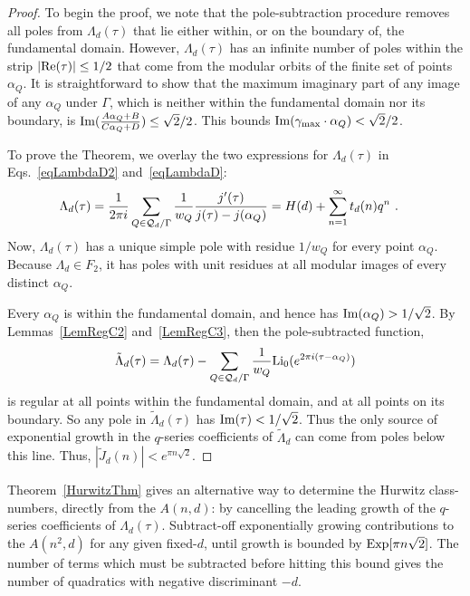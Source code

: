 \documentclass[11pt,a4paper]{article}
\newcommand{\g}{\gamma}
\newcommand{\G}{\Gamma}
\begin{document}
\begin{proof}
To begin the proof, we note that the pole-subtraction procedure removes all poles from $\Lambda_d(\tau)$ that lie either within, or on the boundary of, the fundamental domain. However, $\Lambda_d(\tau)$ has an infinite number of poles within the strip $|{\rm Re}(\tau)| \leq 1/2$ that come from the modular orbits of the finite set of points $\alpha_Q$. It is straightforward to show that the maximum imaginary part of any image of any $\alpha_Q$ under $\G$, which is neither within the fundamental domain nor its boundary, is ${\rm Im}(\frac{A  \alpha_Q + B}{C  \alpha_Q + D}) \leq \sqrt{2}/2$. This bounds ${\rm Im}(\g_{\rm max} \cdot \alpha_Q) <\sqrt{2}/2$. 

To prove the Theorem, we overlay the two expressions for $\Lambda_d(\tau)$ in Eqs.~\eqref{eqLambdaD2} and~\eqref{eqLambdaD}:
\begin{align}
\Lambda_d(\tau) 
&= \frac{1}{2 \pi i} \sum_{Q \in {\cal Q}_d/\G} \frac{1}{w_Q} \frac{j'(\tau)}{j(\tau) - j(\alpha_Q)}
= H(d) + \sum_{n = 1}^{\infty} t_d(n) q^n~.
\end{align}
Now, $\Lambda_d(\tau)$ has a unique simple pole with residue $1/w_Q$ for every point $\alpha_Q$. Because $\Lambda_d \in F_2$, it has poles with unit residues at all modular images of every distinct $\alpha_Q$. 

Every $\alpha_Q$ is within the fundamental domain, and hence has ${\rm Im}(\alpha_Q) > 1/\sqrt{2}$. By Lemmas~\ref{LemRegC2} and~\ref{LemRegC3}, then the pole-subtracted function,
\begin{align}
\tilde{\Lambda}_d(\tau) = \Lambda_d(\tau) - \sum_{Q \in {\cal Q}_d/\G} \frac{1}{w_Q}{\rm Li}_0(e^{2 \pi i (\tau-\alpha_Q)})
\end{align}
is regular at all points within the fundamental domain, and at all points on its boundary. So any pole in $\tilde{\Lambda}_d(\tau)$ has ${\rm Im}( \tau) < 1/\sqrt{2}$. Thus the only source of exponential growth in the $q$-series coefficients of $\tilde{\Lambda}_d$ can come from poles below this line. Thus, $|\tilde{J}_d(n)| < e^{\pi n\sqrt{2}}$.
\end{proof}

Theorem~\ref{HurwitzThm} gives an alternative way to determine the Hurwitz class-numbers, directly from the $A(n,d)$: by cancelling the leading growth of the $q$-series coefficients of $\Lambda_d(\tau)$. Subtract-off exponentially growing contributions to the $A(n^2,d)$ for any given fixed-$d$, until growth is bounded by ${\rm Exp}[\pi n \sqrt{2}]$. The number of terms which must be subtracted before hitting this bound gives the number of quadratics with negative discriminant $-d$.
\end{document}
